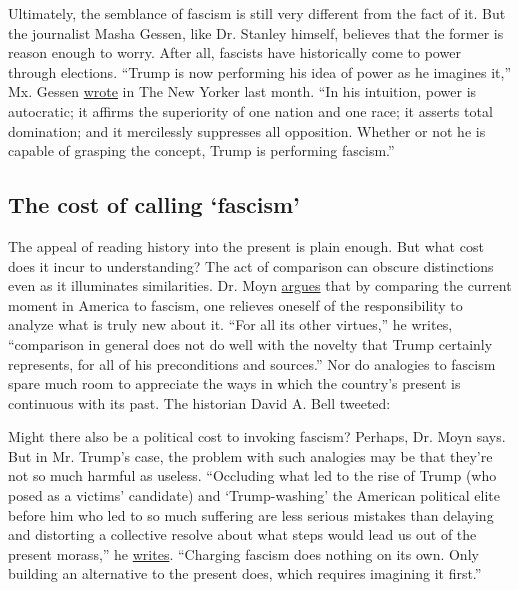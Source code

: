 Ultimately, the semblance of fascism is still very different from the
fact of it. But the journalist Masha Gessen, like Dr. Stanley himself,
believes that the former is reason enough to worry. After all, fascists
have historically come to power through elections. ``Trump is now
performing his idea of power as he imagines it,'' Mx. Gessen
\href{https://www.newyorker.com/news/our-columnists/donald-trumps-fascist-performance}{wrote}
in The New Yorker last month. ``In his intuition, power is autocratic;
it affirms the superiority of one nation and one race; it asserts total
domination; and it mercilessly suppresses all opposition. Whether or not
he is capable of grasping the concept, Trump is performing fascism.''

\hypertarget{the-cost-of-calling-fascism}{%
\subsection{The cost of calling
`fascism'}\label{the-cost-of-calling-fascism}}

The appeal of reading history into the present is plain enough. But what
cost does it incur to understanding? The act of comparison can obscure
distinctions even as it illuminates similarities. Dr. Moyn
\href{https://www.nybooks.com/daily/2020/05/19/the-trouble-with-comparisons/}{argues}
that by comparing the current moment in America to fascism, one relieves
oneself of the responsibility to analyze what is truly new about it.
``For all its other virtues,'' he writes, ``comparison in general does
not do well with the novelty that Trump certainly represents, for all of
his preconditions and sources.'' Nor do analogies to fascism spare much
room to appreciate the ways in which the country's present is continuous
with its past. The historian David A. Bell tweeted:

Might there also be a political cost to invoking fascism? Perhaps, Dr.
Moyn says. But in Mr. Trump's case, the problem with such analogies may
be that they're not so much harmful as useless. ``Occluding what led to
the rise of Trump (who posed as a victims' candidate) and
`Trump-washing' the American political elite before him who led to so
much suffering are less serious mistakes than delaying and distorting a
collective resolve about what steps would lead us out of the present
morass,'' he
\href{https://www.nybooks.com/daily/2020/05/19/the-trouble-with-comparisons/}{writes}.
``Charging fascism does nothing on its own. Only building an alternative
to the present does, which requires imagining it first.''

